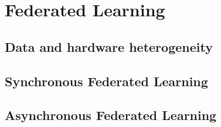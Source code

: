 \section{Federated Learning}

\subsection{Data and hardware heterogeneity}

\subsection{Synchronous Federated Learning}

\subsection{Asynchronous Federated Learning}